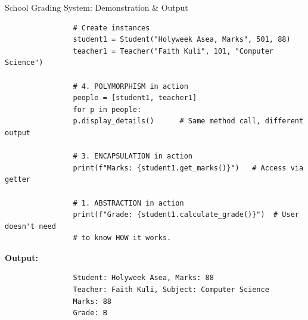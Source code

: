 \documentclass{beamer}
\begin{document}
	\begin{frame}[fragile]{School Grading System: Demonstration \& Output}
		
		{\fontsize{6}{6.5}\selectfont
			\begin{verbatim}
				# Create instances
				student1 = Student("Holyweek Asea, Marks", 501, 88)
				teacher1 = Teacher("Faith Kuli", 101, "Computer Science")
				
				# 4. POLYMORPHISM in action
				people = [student1, teacher1]
				for p in people:
				p.display_details()      # Same method call, different output
				
				# 3. ENCAPSULATION in action
				print(f"Marks: {student1.get_marks()}")   # Access via getter
				
				# 1. ABSTRACTION in action
				print(f"Grade: {student1.calculate_grade()}")  # User doesn't need
				# to know HOW it works.
			\end{verbatim}
		}
		
		\vspace{0.1cm}
		
		\textbf{Output:}
		{\fontsize{6}{6.5}\selectfont
			\begin{verbatim}
				Student: Holyweek Asea, Marks: 88
				Teacher: Faith Kuli, Subject: Computer Science
				Marks: 88
				Grade: B
			\end{verbatim}
		}
		
	\end{frame}
	
\end{document}
